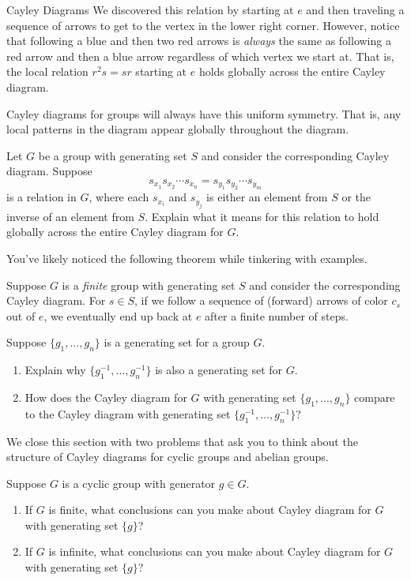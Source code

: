 \begin{section}{Cayley Diagrams}
We discovered this relation by starting at $e$ and then traveling a sequence of arrows to get to the vertex in the lower right corner.  However, notice that following a blue and then two red arrows is \emph{always} the same as following a red arrow and then a blue arrow regardless of which vertex we start at.  That is, the local relation $r^2s=sr$ starting at $e$ holds globally across the entire Cayley diagram.

Cayley diagrams for groups will always have this uniform symmetry. That is, any local patterns in the diagram appear globally throughout the diagram. 

\begin{problem}
Let $G$ be a group with generating set $S$ and consider the corresponding Cayley diagram. Suppose
\[
s_{x_1}s_{x_2}\cdots s_{x_n}=s_{y_1}s_{y_2}\cdots s_{y_m}
\]
is a relation in $G$, where each $s_{x_i}$ and $s_{y_j}$ is either an element from $S$ or the inverse of an element from $S$.  Explain what it means for this relation to hold globally across the entire Cayley diagram for $G$.
\end{problem}

You've likely noticed the following theorem while tinkering with examples.

\begin{theorem}
Suppose $G$ is a \emph{finite} group with generating set $S$ and consider the corresponding Cayley diagram. For $s\in S$, if we follow a sequence of (forward) arrows of color $c_s$ out of $e$, we eventually end up back at $e$ after a finite number of steps.
\end{theorem}

\begin{problem}
Suppose $\{g_1,\ldots,g_n\}$ is a generating set for a group $G$.
\begin{enumerate}[label=\textrm{(\alph*)}]
\item Explain why $\{g^{-1}_1,\ldots,g^{-1}_n\}$ is also a generating set for $G$.
\item How does the Cayley diagram for $G$ with generating set $\{g_1,\ldots,g_n\}$ compare to the Cayley diagram with generating set $\{g^{-1}_1,\ldots,g^{-1}_n\}$?
\end{enumerate}
\end{problem}

We close this section with two problems that ask you to think about the structure of Cayley diagrams for cyclic groups and abelian groups.

\begin{problem}
Suppose $G$ is a cyclic group with generator $g\in G$.
\begin{enumerate}[label=\textrm{(\alph*)}]
\item If $G$ is finite, what conclusions can you make about Cayley diagram for $G$ with generating set $\{g\}$?
\item If $G$ is infinite, what conclusions can you make about Cayley diagram for $G$ with generating set $\{g\}$?
\end{enumerate}
\end{problem}


\end{section}
